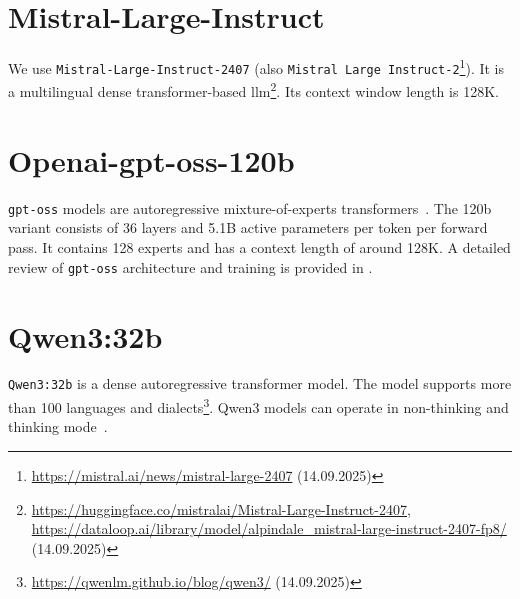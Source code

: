 

\section{Mistral-Large-Instruct}

We use \texttt{Mistral-Large-Instruct-2407} (also \texttt{Mistral Large Instruct-2}\footnote{\url{https://mistral.ai/news/mistral-large-2407} (14.09.2025)}).
It is a multilingual dense transformer-based \ac{llm}\footnote{\url{https://huggingface.co/mistralai/Mistral-Large-Instruct-2407}, \url{https://dataloop.ai/library/model/alpindale_mistral-large-instruct-2407-fp8/} (14.09.2025)}.
Its context window length is 128K.

\section{Openai-gpt-oss-120b}

\texttt{gpt-oss} models are autoregressive mixture-of-experts transformers~\citep{openai2025gptoss120bgptoss20bmodel}.
The 120b variant consists of 36 layers and 5.1B active parameters per token per forward pass.
It contains 128 experts and has a context length of around 128K.
A detailed review of \texttt{gpt-oss} architecture and training is provided in \citep{openai2025gptoss120bgptoss20bmodel}.


\section{Qwen3:32b}
\texttt{Qwen3:32b} is a dense autoregressive transformer model.
The model supports more than 100 languages and dialects\footnote{\url{https://qwenlm.github.io/blog/qwen3/} (14.09.2025)}.
Qwen3 models can operate in non-thinking and thinking mode~\citep{qwen3_technical_report}.
